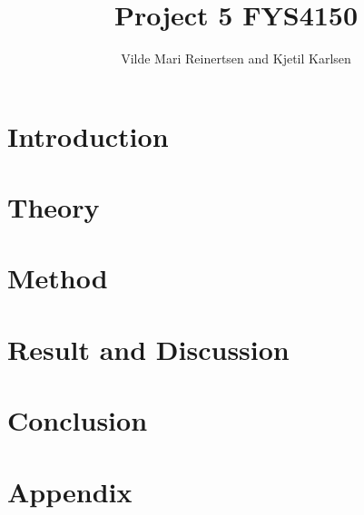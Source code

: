 



\title{Project 5 FYS4150}
\author{Vilde Mari Reinertsen and Kjetil Karlsen}
\raggedbottom



\maketitle

\pagestyle{fancy}



\begin{abstract}







  
\tableofcontents
\end{abstract}


\section{Introduction}


\section{Theory}


\section{Method}


\section{Result and Discussion\label{sec:res}}


%

\section{Conclusion}


\newpage



\section*{Appendix}




